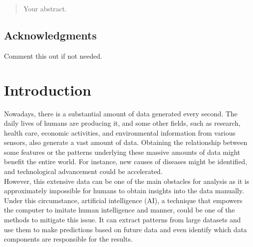 \documentclass[12pt,twoside]{report}
\date{June 2022}
\begin{document}



\clearpage{\pagestyle{empty}\cleardoublepage}
\setcounter{page}{1}
\pagestyle{plain}
\graphicspath{ {./figures/} }

\begin{abstract}
Your abstract.
\end{abstract}

\cleardoublepage
\section*{Acknowledgments}
Comment this out if not needed.

\clearpage{\pagestyle{empty}\cleardoublepage}

\tableofcontents 


\clearpage{\pagestyle{empty}\cleardoublepage}
\setcounter{page}{1}
\fancyhead[LE,RO]{\slshape \rightmark}
\fancyhead[LO,RE]{\slshape \leftmark}

\chapter{Introduction}

Nowadays, there is a substantial amount of data generated every second. The daily lives of humans are producing it, and some other fields, such as research, health care, economic activities, and environmental information from various sensors, also generate a vast amount of data. Obtaining the relationship between some features or the patterns underlying these massive amounts of data might benefit the entire world. For instance, new causes of diseases might be identified, and technological advancement could be accelerated.
\\

However, this extensive data can be one of the main obstacles for analysis as it is approximately impossible for humans to obtain insights into the data manually. Under this circumstance, artificial intelligence (AI), a technique that empowers the computer to imitate human intelligence and manner,  could be one of the methods to mitigate this issue. It can extract patterns from large datasets and use them to make predictions based on future data and even identify which data components are responsible for the results.
\\
\end{document}
